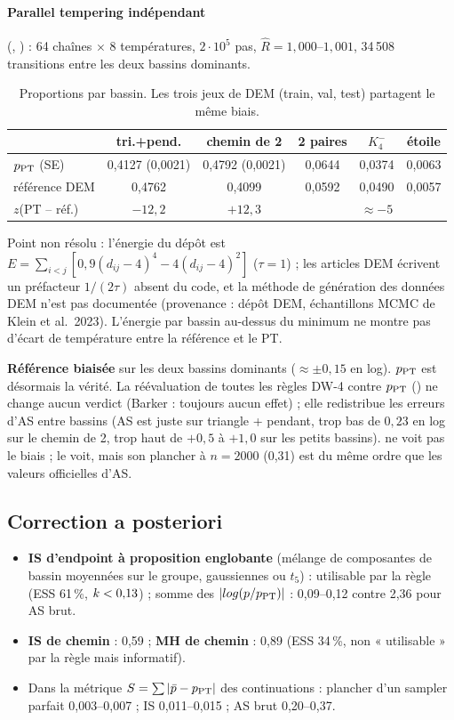 \paragraph{Parallel tempering indépendant} (, ) : 64 chaînes $\times$ 8 températures, $2\cdot10^5$ pas, $\hat R=1{,}000$--$1{,}001$, 34\,508 transitions entre les deux bassins dominants.
\begin{table}[h]\centering\small
\begin{tabular}{lccccc}\toprule
 & tri.+pend. & chemin de 2 & 2 paires & $K_4^-$ & étoile\\\midrule
$p_{\rm PT}$ (SE) & 0,4127 (0,0021) & 0,4792 (0,0021) & 0,0644 & 0,0374 & 0,0063\\
référence DEM & 0,4762 & 0,4099 & 0,0592 & 0,0490 & 0,0057\\
$z$(PT -- réf.) & $-12{,}2$ & $+12{,}3$ & & $\approx-5$ & \\\bottomrule
\end{tabular}
\caption{Proportions par bassin. Les trois jeux de DEM (train, val, test) partagent le même biais.}
\end{table}
Point non résolu : l'énergie du dépôt est $E=\sum_{i<j}[0{,}9(d_{ij}-4)^4-4(d_{ij}-4)^2]$ ($\tau=1$) ; les articles DEM écrivent un préfacteur $1/(2\tau)$ absent du code, et la méthode de génération des données DEM n'est pas documentée (provenance : dépôt DEM, échantillons MCMC de Klein et al.\ 2023). L'énergie par bassin au-dessus du minimum ne montre pas d'écart de température entre la référence et le PT.
\begin{verdict}\textbf{Référence biaisée} sur les deux bassins dominants ($\approx\pm0{,}15$ en log). $p_{\rm PT}$ est désormais la vérité. La réévaluation de toutes les règles DW-4 contre $p_{\rm PT}$ () ne change aucun verdict (Barker : toujours aucun effet) ; elle redistribue les erreurs d'AS entre bassins (AS est juste sur triangle + pendant, trop bas de $0{,}23$ en log sur le chemin de 2, trop haut de $+0{,}5$ à $+1{,}0$ sur les petits bassins).  ne voit pas le biais ;  le voit, mais son plancher à $n=2000$ (0,31) est du même ordre que les valeurs officielles d'AS.\end{verdict}

\subsection{Correction a posteriori}
\begin{itemize}
  \item \textbf{IS d'endpoint à proposition englobante} (mélange de composantes de bassin moyennées sur le groupe, gaussiennes ou $t_5$) : utilisable par la règle (ESS 61\,\%, $\khat<0{,}13$) ; somme des $|\log(p/p_{\rm PT})|$ : 0,09--0,12 contre 2,36 pour AS brut.
  \item \textbf{IS de chemin} : 0,59 ; \textbf{MH de chemin} : 0,89 (ESS 34\,\%, non « utilisable » par la règle mais informatif).
  \item Dans la métrique $S=\sum|\bar p-p_{\rm PT}|$ des continuations : plancher d'un sampler parfait 0,003--0,007 ; IS 0,011--0,015 ; AS brut 0,20--0,37.
\end{itemize}

